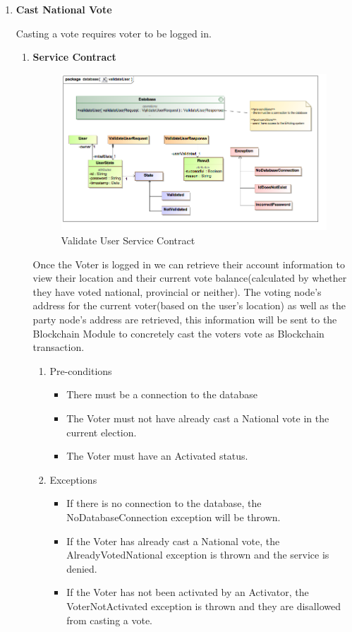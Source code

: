 


\begin{enumerate}
	\item \textbf{Cast National Vote}
	
	Casting a vote requires voter to be logged in.
	
	\begin{enumerate}
		\item \textbf{Service Contract}
		\begin{figure}[H]
			\centering
			\includegraphics[width=0.75\linewidth]{../Images/Database/ServiceContracts/ValidateUser_ServiceContract.png}
			\caption{Validate User Service Contract}
		\end{figure}
		
		Once the Voter is logged in we can retrieve their account information to view their location and their current vote balance(calculated by whether they have voted national, provincial or neither). \newline
	 The voting node’s address for the current voter(based on the user’s location) as well as the party node’s address are retrieved, this information will be sent to the Blockchain Module to concretely cast the voters vote as Blockchain transaction.
		\newline				
		
		\begin{enumerate}
			\item Pre-conditions
			\begin{itemize}
				\item There must be a connection to the database
				\item The Voter must not have already cast a National vote in the current election. 
				\item The Voter must have an Activated status.  
			\end{itemize}
			
			\item Exceptions
			\begin{itemize}
				\item If there is no connection to the database, the NoDatabaseConnection exception will be thrown.
				\item If the Voter has already cast a National vote, the AlreadyVotedNational exception is thrown and the service is denied.
				\item If the Voter has not been activated by an Activator, the VoterNotActivated exception is thrown and they are disallowed from casting a vote. 
			\end{itemize}
			

\end{enumerate}
\end{enumerate}
\end{enumerate}
